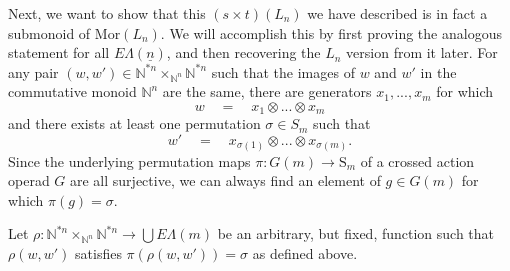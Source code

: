 \documentclass{amsbook} %
\newcommand{\EL}{E\Lambda}
\newcommand{\ELn}{E\Lambda(\underline{n})}
\numberwithin{section}{chapter}
\begin{document}
Next, we want to show that this $(s \times t)(L_n)$ we have described is in fact a submonoid of $\mathrm{Mor}(L_n)$.  We will accomplish this  by first proving the analogous statement for all $\ELn$, and then recovering the $L_n$ version from it later.  For any pair $(w, w') \in \mathbb{N}^{\ast n} \times_{\mathbb{N}^n} \mathbb{N}^{\ast n}$ such that the images of $w$ and $w'$ in the commutative monoid $\mathbb{N}^n$ are the same, there are generators $x_1, ..., x_m$ for which 
\[ w \quad = \quad x_1 \otimes ... \otimes x_m \]
and there exists at least one permutation $\sigma \in S_m$ such that
\[ w' \quad = \quad x_{\sigma(1)} \otimes ... \otimes x_{\sigma(m)}. \]
Since the underlying permutation maps $\pi : G(m) \to \mathrm{S}_m$ of a crossed action operad $G$ are all surjective, we can always find an element of $g \in G(m)$ for which $\pi(g) = \sigma$. 

\begin{nota}\label{rho_ww'}
Let $\rho:\mathbb{N}^{\ast n} \times_{\mathbb{N}^n} \mathbb{N}^{\ast n} \to \bigcup \EL(m)$ be an arbitrary, but fixed, function such that $\rho(w,w')$ satisfies $\pi(\rho(w,w')) = \sigma$ as defined above.
\end{nota}
\end{document}

